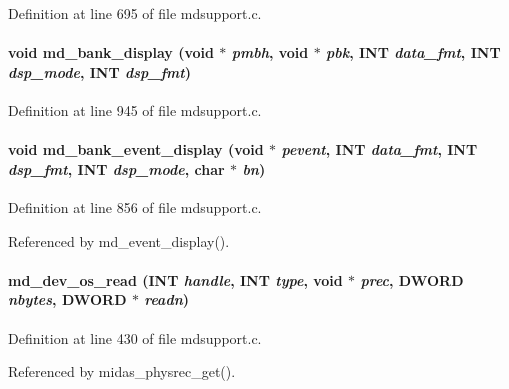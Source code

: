 Definition at line 695 of file mdsupport.c.
\paragraph[{md\_\-bank\_\-display}]{\setlength{\rightskip}{0pt plus 5cm}void md\_\-bank\_\-display (void $\ast$ {\em pmbh}, \/  void $\ast$ {\em pbk}, \/  {\bf INT} {\em data\_\-fmt}, \/  {\bf INT} {\em dsp\_\-mode}, \/  {\bf INT} {\em dsp\_\-fmt})}\hfill\label{group__mdsupportincludecode_gaef93341050b80ec7bdae823fded45631}


Definition at line 945 of file mdsupport.c.
\paragraph[{md\_\-bank\_\-event\_\-display}]{\setlength{\rightskip}{0pt plus 5cm}void md\_\-bank\_\-event\_\-display (void $\ast$ {\em pevent}, \/  {\bf INT} {\em data\_\-fmt}, \/  {\bf INT} {\em dsp\_\-fmt}, \/  {\bf INT} {\em dsp\_\-mode}, \/  char $\ast$ {\em bn})}\hfill\label{group__mdsupportincludecode_ga19aa1bd92dc4546ceca8f4831d8c4fd7}


Definition at line 856 of file mdsupport.c.

Referenced by md\_\-event\_\-display().
\paragraph[{md\_\-dev\_\-os\_\-read}]{ md\_\-dev\_\-os\_\-read ({\bf INT} {\em handle}, \/  {\bf INT} {\em type}, \/  void $\ast$ {\em prec}, \/  {\bf DWORD} {\em nbytes}, \/  {\bf DWORD} $\ast$ {\em readn})}\hfill\label{group__mdsupportincludecode_ga49411df0bf81f3111d28560d98983c09}


Definition at line 430 of file mdsupport.c.

Referenced by midas\_\-physrec\_\-get().
